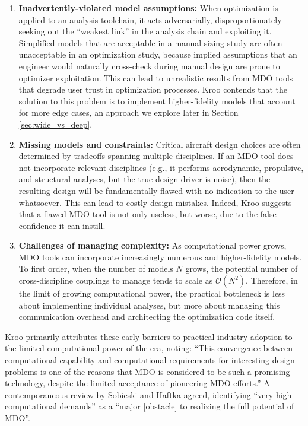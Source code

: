 \documentclass[12pt,vi,oneside,table]{report}
\begin{document}
    \begin{enumerate}
        \item \textbf{Inadvertently-violated model assumptions:} When optimization is applied to an analysis toolchain, it acts adversarially, disproportionately seeking out the ``weakest link'' in the analysis chain and exploiting it. Simplified models that are acceptable in a manual sizing study are often unacceptable in an optimization study, because implied assumptions that an engineer would naturally cross-check during manual design are prone to optimizer exploitation. This can lead to unrealistic results from MDO tools that degrade user trust in optimization processes. Kroo contends that the solution to this problem is to implement higher-fidelity models that account for more edge cases, an approach we explore later in Section \ref{sec:wide_vs_deep}.
        \item \textbf{Missing models and constraints:} Critical aircraft design choices are often determined by tradeoffs spanning multiple disciplines. If an MDO tool does not incorporate relevant disciplines (e.g., it performs aerodynamic, propulsive, and structural analyses, but the true design driver is noise), then the resulting design will be fundamentally flawed with no indication to the user whatsoever. This can lead to costly design mistakes. Indeed, Kroo suggests that a flawed MDO tool is not only useless, but worse, due to the false confidence it can instill.
        \item \textbf{Challenges of managing complexity:} As computational power grows, MDO tools can incorporate increasingly numerous and higher-fidelity models. To first order, when the number of models $N$ grows, the potential number of cross-discipline couplings to manage tends to scale as $\mathcal{O}(N^2)$. Therefore, in the limit of growing computational power, the practical bottleneck is less about implementing individual analyses, but more about managing this communication overhead and architecting the optimization code itself.
    \end{enumerate}

    Kroo primarily attributes these early barriers to practical industry adoption to the limited computational power of the era, noting: ``This convergence between computational capability and computational requirements for interesting design problems is one of the reasons that MDO is considered to be such a promising technology, despite the limited acceptance of pioneering MDO efforts.'' A contemporaneous review by Sobieski and Haftka agreed, identifying ``very high computational demands'' as a ``major [obstacle] to realizing the full potential of MDO''. \cite{haftka_multidisciplinary_1997}
\end{document}
